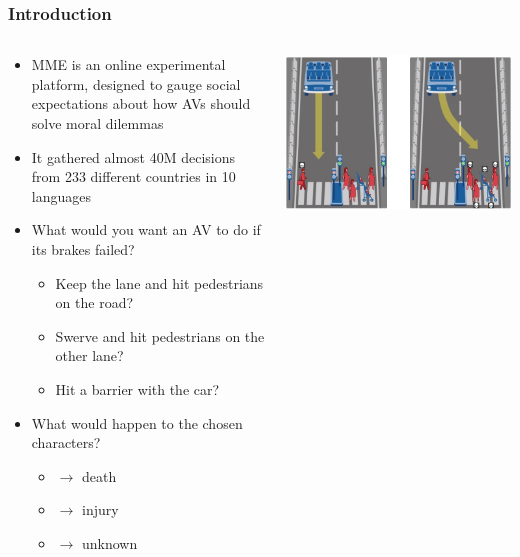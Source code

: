 \documentclass[aspectratio=169]{beamer}
\begin{document}
\begin{frame}
    \frametitle{Introduction}
    \begin{columns}[totalwidth=1.0\textwidth]
        \begin{column}{0.6\linewidth}
            \begin{itemize}
                \item MME \cite{mme} is an online experimental platform, designed to gauge social expectations about how AVs should solve moral dilemmas
                \item It gathered almost \num{40}M decisions from \num{233} different countries in \num{10} languages
                \item What would you want an AV to do if its brakes failed?
                      \begin{itemize}
                          \item Keep the lane and hit pedestrians on the road?
                          \item Swerve and hit pedestrians on the other lane?
                          \item Hit a barrier with the car?
                      \end{itemize}
                \item What would happen to the chosen characters?
                      \begin{itemize}
                          \item {}  $\rightarrow$ death
                          \item {} $\rightarrow$ injury
                          \item {} $\rightarrow$ unknown
                      \end{itemize}
            \end{itemize}
        \end{column}
        \begin{column}{0.4\linewidth}
            \includegraphics[width=1.0\linewidth]{assets/example-mme.jpg}
        \end{column}
    \end{columns}
\end{frame}
\end{document}
